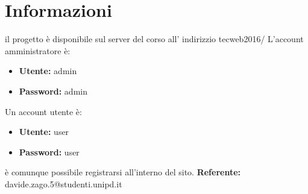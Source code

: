 \section{Informazioni}
il progetto è disponibile sul server del corso all' indirizzio tecweb2016/ \newline
L'account amministratore è:
\begin{itemize}
    \item \textbf{Utente:} admin
    \item \textbf{Password:} admin	
\end{itemize}
Un account utente è:
\begin{itemize}
	\item \textbf{Utente:} user
	\item \textbf{Password:} user
\end{itemize}
è comunque possibile registrarsi all'interno del sito.\newline
\textbf{Referente:} davide.zago.5@studenti.unipd.it
